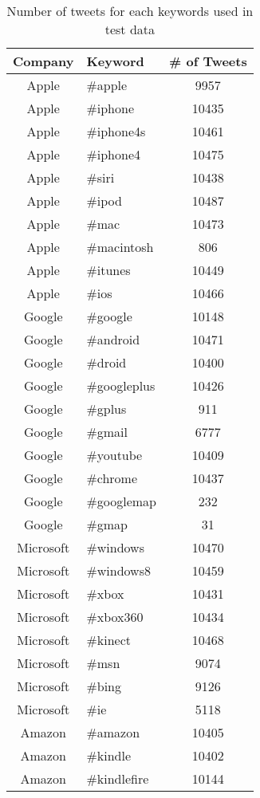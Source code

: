 \documentclass[12pt]{article}
\begin{document}
\begin{table}
\begin{center}
    \begin{tabular}{ | c || l | c | }
        \hline
        \textbf{Company} &  \textbf{Keyword} & \textbf{\# of Tweets} \\ \hline
        \hline
        Apple &  \#apple & 9957 \\ \hline
        Apple &  \#iphone & 10435 \\ \hline
        Apple &  \#iphone4s & 10461 \\ \hline
        Apple &  \#iphone4 & 10475 \\ \hline
        Apple &  \#siri & 10438 \\ \hline
        Apple &  \#ipod & 10487 \\ \hline
        Apple &  \#mac & 10473 \\ \hline
        Apple &  \#macintosh & 806 \\ \hline
        Apple &  \#itunes & 10449 \\ \hline
        Apple &  \#ios & 10466 \\ \hline
        Google &  \#google & 10148 \\ \hline
        Google &  \#android & 10471 \\ \hline
        Google &  \#droid & 10400 \\ \hline
        Google &  \#googleplus & 10426 \\ \hline
        Google &  \#gplus & 911 \\ \hline
        Google &  \#gmail & 6777 \\ \hline
        Google &  \#youtube & 10409 \\ \hline
        Google &  \#chrome & 10437 \\ \hline
        Google &  \#googlemap & 232 \\ \hline
        Google &  \#gmap & 31 \\ \hline
        Microsoft &  \#windows & 10470 \\ \hline
        Microsoft &  \#windows8 & 10459 \\ \hline
        Microsoft &  \#xbox & 10431 \\ \hline
        Microsoft &  \#xbox360 & 10434 \\ \hline
        Microsoft &  \#kinect & 10468 \\ \hline
        Microsoft &  \#msn & 9074 \\ \hline
        Microsoft &  \#bing & 9126 \\ \hline
        Microsoft &  \#ie & 5118 \\ \hline
        Amazon &  \#amazon & 10405 \\ \hline
        Amazon &  \#kindle & 10402 \\ \hline
        Amazon &  \#kindlefire & 10144 \\ \hline
        \hline
    \end{tabular}
\caption{Number of tweets for each keywords used in test data}
\label{keywords-tweet-numbers} %
\end{center}
\end{table}
\end{document}
